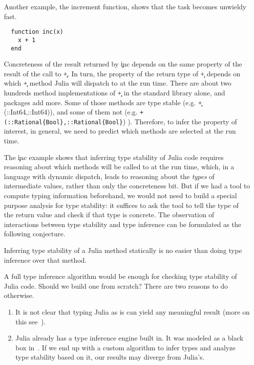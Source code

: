 \documentclass[sigplan,screen]{acmart}
\begin{document}
Another example, the increment function, shows that the task becomes unwieldy fast.
%
\begin{verbatim}
  function inc(x)
    x + 1
  end
\end{verbatim}
%
Concreteness of the result returned by \c{inc} depends on the same property of
the result of the call to \c{+}. In turn, the property of the return type of
\c{+} depends on which \c{+} method Julia will dispatch to at the run time.
There are about two hundreds method implementations of \c{+} in the standard
library alone, and packages add more. Some of those methods are type stable
(e.g. \c{+(::Int64,::Int64)}), and some of them not (e.g.
\lstinline|+(::Rational{Bool},::Rational{Bool}|)
).
Therefore,
to infer the property of interest, in general,
we need to predict which methods are selected at the run time.

The \c{inc} example shows that inferring type stability of Julia code
requires
reasoning about which methods will be called to at the run time, which, in a
language with dynamic dispatch, leads
to reasoning about the \emph{types} of intermediate values, rather than only
the concreteness bit. But if we had a tool to compute typing information
beforehand, we would not need to build a special purpose analysis for type
stability: it suffices to ask the tool to tell the type of the return value and
check if that type is concrete. The observation of interactions between type
stability and type inference can be formulated as the following conjecture.

\begin{conjecture}
Inferring type stability of a Julia method statically is no easier than doing type
inference over that method.
\end{conjecture}

A full type inference algorithm would be enough for checking type stability of
Julia code. Should we build one from scratch? There are two reasons to do
otherwise.
\begin{enumerate}

  \item It is not clear that typing Julia as is can yield any meaningful result
  (more on this see~\cite{Chung23}).

  \item Julia already has a type inference engine built in. It was modeled
        as a black box in~\cite{Pelenitsyn21}. If we end up with a
        custom algorithm to infer types and analyze type stability based on it,
        our results may diverge from Julia's.
\end{enumerate}
\end{document}
